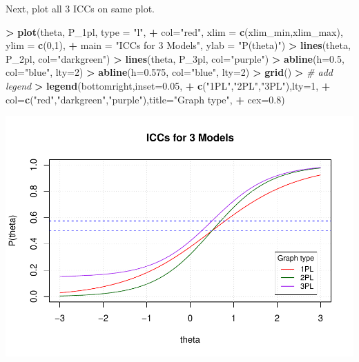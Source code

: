 \documentclass[
]{article}
\newenvironment{Shaded}{\begin{snugshade}}{\end{snugshade}}
\newcommand{\AttributeTok}[1]{\textcolor[rgb]{0.13,0.29,0.53}{#1}}
\newcommand{\CommentTok}[1]{\textcolor[rgb]{0.56,0.35,0.01}{\textit{#1}}}
\newcommand{\DecValTok}[1]{\textcolor[rgb]{0.00,0.00,0.81}{#1}}
\newcommand{\ErrorTok}[1]{\textcolor[rgb]{0.64,0.00,0.00}{\textbf{#1}}}
\newcommand{\FloatTok}[1]{\textcolor[rgb]{0.00,0.00,0.81}{#1}}
\newcommand{\FunctionTok}[1]{\textcolor[rgb]{0.13,0.29,0.53}{\textbf{#1}}}
\newcommand{\NormalTok}[1]{#1}
\newcommand{\SpecialCharTok}[1]{\textcolor[rgb]{0.81,0.36,0.00}{\textbf{#1}}}
\newcommand{\StringTok}[1]{\textcolor[rgb]{0.31,0.60,0.02}{#1}}
\begin{document}
Next, plot all 3 ICCs on same plot.

\begin{Shaded}
\begin{Highlighting}[]
\SpecialCharTok{\textgreater{}} \FunctionTok{plot}\NormalTok{(theta, P\_1pl, }\AttributeTok{type =} \StringTok{"l"}\NormalTok{, }
\SpecialCharTok{+}      \AttributeTok{col=}\StringTok{"red"}\NormalTok{, }\AttributeTok{xlim =} \FunctionTok{c}\NormalTok{(xlim\_min,xlim\_max), }\AttributeTok{ylim =} \FunctionTok{c}\NormalTok{(}\DecValTok{0}\NormalTok{,}\DecValTok{1}\NormalTok{),}
\SpecialCharTok{+}      \AttributeTok{main =} \StringTok{"ICCs for 3 Models"}\NormalTok{, }\AttributeTok{ylab =} \StringTok{"P(theta)"}\NormalTok{)}
\SpecialCharTok{\textgreater{}} \FunctionTok{lines}\NormalTok{(theta, P\_2pl, }\AttributeTok{col=}\StringTok{"darkgreen"}\NormalTok{)}
\SpecialCharTok{\textgreater{}} \FunctionTok{lines}\NormalTok{(theta, P\_3pl, }\AttributeTok{col=}\StringTok{"purple"}\NormalTok{)}
\SpecialCharTok{\textgreater{}} \FunctionTok{abline}\NormalTok{(}\AttributeTok{h=}\FloatTok{0.5}\NormalTok{, }\AttributeTok{col=}\StringTok{"blue"}\NormalTok{, }\AttributeTok{lty=}\DecValTok{2}\NormalTok{)}
\SpecialCharTok{\textgreater{}} \FunctionTok{abline}\NormalTok{(}\AttributeTok{h=}\FloatTok{0.575}\NormalTok{, }\AttributeTok{col=}\StringTok{"blue"}\NormalTok{, }\AttributeTok{lty=}\DecValTok{2}\NormalTok{)}
\SpecialCharTok{\textgreater{}} \FunctionTok{grid}\NormalTok{()}
\SpecialCharTok{\textgreater{}} \CommentTok{\# add legend}
\ErrorTok{\textgreater{}} \FunctionTok{legend}\NormalTok{(}\StringTok{\textquotesingle{}bottomright\textquotesingle{}}\NormalTok{,}\AttributeTok{inset=}\FloatTok{0.05}\NormalTok{,}
\SpecialCharTok{+}        \FunctionTok{c}\NormalTok{(}\StringTok{"1PL"}\NormalTok{,}\StringTok{"2PL"}\NormalTok{,}\StringTok{"3PL"}\NormalTok{),}\AttributeTok{lty=}\DecValTok{1}\NormalTok{,}
\SpecialCharTok{+}        \AttributeTok{col=}\FunctionTok{c}\NormalTok{(}\StringTok{"red"}\NormalTok{,}\StringTok{"darkgreen"}\NormalTok{,}\StringTok{"purple"}\NormalTok{),}\AttributeTok{title=}\StringTok{"Graph type"}\NormalTok{,}
\SpecialCharTok{+}        \AttributeTok{cex=}\FloatTok{0.8}\NormalTok{)}
\end{Highlighting}
\end{Shaded}

\includegraphics{Assignment_1_files/figure-latex/unnamed-chunk-14-1.pdf}
\end{document}
